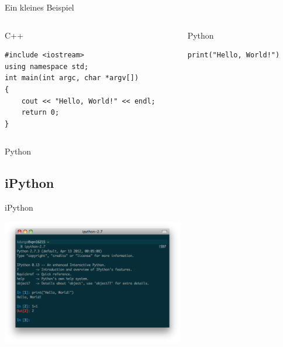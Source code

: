 \begin{frame}[fragile]{Ein kleines Beispiel}
  \vspace{-1em}
  \begin{columns}
    \begin{column}{0.5\textwidth}
      \begin{exampleblock}{C++}
        \begin{verbatim}
#include <iostream>
using namespace std;
int main(int argc, char *argv[])
{
    cout << "Hello, World!" << endl;
    return 0;
}
        \end{verbatim}
      \end{exampleblock}
    \end{column}
    \begin{column}{0.5\textwidth}
      \begin{exampleblock}{Python}
        \begin{verbatim}
print("Hello, World!")
        \end{verbatim}
      \end{exampleblock}
    \end{column}
  \end{columns}
\end{frame}

\begin{frame}{Python}
  \tableofcontents[sectionstyle=show/hide,
                   subsectionstyle=show/show/hide,
                   subsubsectionstyle=show/show/show]
\end{frame}

\subsection{iPython}
\begin{frame}{iPython}
  \begin{center}
    \includegraphics[width=300px]{img/ipython.png}
  \end{center}
\end{frame}

